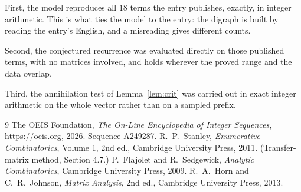 \documentclass[11pt,a4paper]{article}
\theoremstyle{plain}
\theoremstyle{definition}
\begin{document}
First, the model reproduces all $18$ terms the entry publishes, exactly, in integer
arithmetic. This is what ties the model to the entry: the digraph is built by reading the
entry's English, and a misreading gives different counts.

Second, the conjectured recurrence was evaluated directly on those published terms, with no
matrices involved, and holds wherever the proved range and the data overlap.

Third, the annihilation test of Lemma~\ref{lem:crit} was carried out in exact integer
arithmetic on the whole vector rather than on a sampled prefix.

\begin{thebibliography}{9}
 The OEIS Foundation, \emph{The On-Line Encyclopedia of Integer
Sequences}, \url{https://oeis.org}, 2026. Sequence A249287.
 R.~P.~Stanley, \emph{Enumerative Combinatorics}, Volume 1, 2nd ed.,
Cambridge University Press, 2011. (Transfer-matrix method, Section 4.7.)
 P.~Flajolet and R.~Sedgewick, \emph{Analytic Combinatorics}, Cambridge
University Press, 2009.
 R.~A.~Horn and C.~R.~Johnson, \emph{Matrix Analysis}, 2nd ed., Cambridge
University Press, 2013.
\end{thebibliography}
\end{document}
